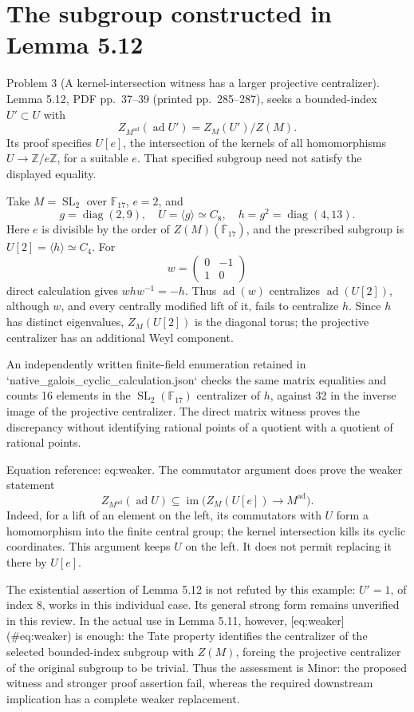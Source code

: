 \documentclass[10pt]{article}
\begin{document}
\section*{The subgroup constructed in Lemma 5.12}
Problem 3 (A kernel-intersection witness has a larger projective centralizer).  Lemma 5.12, PDF pp. 37–39 (printed pp. 285–287), seeks a bounded-index \(U'\subset U\) with \[Z_{M^{\mathrm{ad}}}(\operatorname{ad}U')=Z_M(U')/Z(M).\] Its proof specifies \(U[e]\), the intersection of the kernels of all homomorphisms \(U\to\mathbb Z/e\mathbb Z\), for a suitable \(e\). That specified subgroup need not satisfy the displayed equality.\par
Take \(M=\operatorname{SL}_2\) over \(\mathbb F_{17}\), \(e=2\), and \[g=\operatorname{diag}(2,9),\quad U=\langle g\rangle\simeq C_8,\quad
 h=g^2=\operatorname{diag}(4,13).\] Here \(e\) is divisible by the order of \(Z(M)(\overline{\mathbb F}_{17})\), and the prescribed subgroup is \(U[2]=\langle h\rangle\simeq C_4\). For \[w=\begin{pmatrix}0&-1\\1&0\end{pmatrix}\] direct calculation gives \(whw^{-1}=-h\). Thus \(\operatorname{ad}(w)\) centralizes \(\operatorname{ad}(U[2])\), although \(w\), and every centrally modified lift of it, fails to centralize \(h\). Since \(h\) has distinct eigenvalues, \(Z_M(U[2])\) is the diagonal torus; the projective centralizer has an additional Weyl component.\par
An independently written finite-field enumeration retained in `native\_galois\_cyclic\_calculation.json` checks the same matrix equalities and counts 16 elements in the \(\operatorname{SL}_2(\mathbb F_{17})\) centralizer of \(h\), against 32 in the inverse image of the projective centralizer. The direct matrix witness proves the discrepancy without identifying rational points of a quotient with a quotient of rational points.\par
Equation reference: eq:weaker. The commutator argument does prove the weaker statement \[
 Z_{M^{\mathrm{ad}}}(\operatorname{ad}U)
       \subseteq \operatorname{im}\bigl(Z_M(U[e])\to M^{\mathrm{ad}}\bigr).\] Indeed, for a lift of an element on the left, its commutators with \(U\) form a homomorphism into the finite central group; the kernel intersection kills its cyclic coordinates. This argument keeps \(U\) on the left. It does not permit replacing it there by \(U[e]\).\par
The existential assertion of Lemma 5.12 is not refuted by this example: \(U'=1\), of index 8, works in this individual case. Its general strong form remains unverified in this review. In the actual use in Lemma 5.11, however, [eq:weaker] (\#eq:weaker) is enough: the Tate property identifies the centralizer of the selected bounded-index subgroup with \(Z(M)\), forcing the projective centralizer of the original subgroup to be trivial. Thus the assessment is Minor: the proposed witness and stronger proof assertion fail, whereas the required downstream implication has a complete weaker replacement.\par
\end{document}
